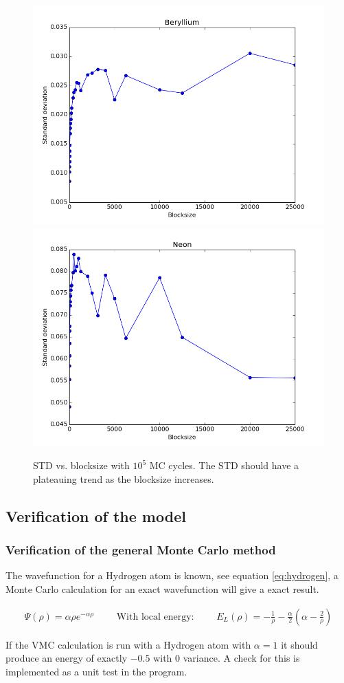 \documentclass[11pt]{article}
\begin{document}
		\begin{figure}
			\centering \includegraphics[width=0.45\linewidth]{../figures/Beryllium_blocking}
			\centering \includegraphics[width=0.45\linewidth]{../figures/Neon_blocking}
			\protect\caption{STD vs. blocksize with $10^{5}$ MC cycles.  The STD should have a plateauing trend as the blocksize increases.} \label{fig01:std_Stuff}
		\end{figure}

	\subsection{Verification of the model}

		\subsubsection{Verification of the general Monte Carlo method}
			The wavefunction for a Hydrogen atom is known, see equation \eqref{eq:hydrogen}, a Monte Carlo calculation for an exact wavefunction will give a exact result.

			\begin{align}
				 \Psi(\rho ) = \alpha \rho e^{-\alpha\rho} \qquad \text{ With  local energy: } \qquad E_{L} (\rho) = - \frac{1}{\rho} - \frac{\alpha}{2} \left( \alpha - \frac{2}{\rho} \right) \label{eq:hydrogen}
			\end{align}

			If the VMC calculation is run with a Hydrogen atom with \(\alpha = 1\) it should produce an energy of exactly \( -0.5\) with \(0\) variance. A check for this is implemented as a unit test in the program.
\end{document}

